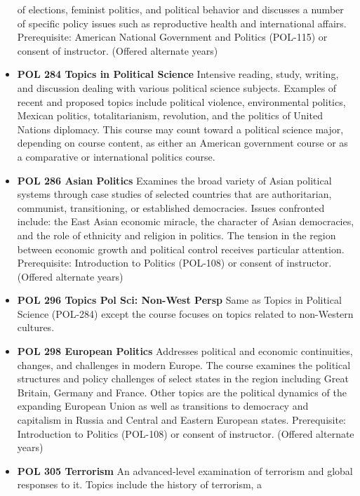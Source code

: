 \documentclass[
  letterpaper,
]{scrbook}
\begin{document}
\begin{itemize}
  of elections, feminist politics, and political behavior and discusses
  a number of specific policy issues such as reproductive health and
  international affairs. Prerequisite: American National Government and
  Politics (POL-115) or consent of instructor. (Offered alternate years)
\item
  \textbf{POL 284 Topics in Political Science} Intensive reading, study,
  writing, and discussion dealing with various political science
  subjects. Examples of recent and proposed topics include political
  violence, environmental politics, Mexican politics, totalitarianism,
  revolution, and the politics of United Nations diplomacy. This course
  may count toward a political science major, depending on course
  content, as either an American government course or as a comparative
  or international politics course.
\item
  \textbf{POL 286 Asian Politics} Examines the broad variety of Asian
  political systems through case studies of selected countries that are
  authoritarian, communist, transitioning, or established democracies.
  Issues confronted include: the East Asian economic miracle, the
  character of Asian democracies, and the role of ethnicity and religion
  in politics. The tension in the region between economic growth and
  political control receives particular attention. Prerequisite:
  Introduction to Politics (POL-108) or consent of instructor. (Offered
  alternate years)\\
\item
  \textbf{POL 296 Topics Pol Sci: Non-West Persp} Same as Topics in
  Political Science (POL-284) except the course focuses on topics
  related to non-Western cultures.\\
\item
  \textbf{POL 298 European Politics} Addresses political and economic
  continuities, changes, and challenges in modern Europe. The course
  examines the political structures and policy challenges of select
  states in the region including Great Britain, Germany and France.
  Other topics are the political dynamics of the expanding European
  Union as well as transitions to democracy and capitalism in Russia and
  Central and Eastern European states. Prerequisite: Introduction to
  Politics (POL-108) or consent of instructor. (Offered alternate
  years)\\
\item
  \textbf{POL 305 Terrorism} An advanced-level examination of terrorism
  and global responses to it. Topics include the history of terrorism, a

\end{itemize}
\end{document}

